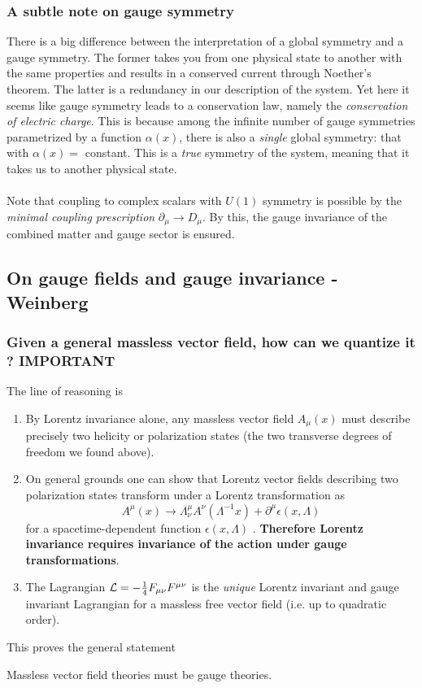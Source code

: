 \subsubsection{A subtle note on gauge symmetry}
There is a big difference between the interpretation of a global symmetry and a gauge symmetry. The former takes you from one physical state to another with the same properties and results in a conserved current through Noether's theorem. The latter is a redundancy in our description of the system. Yet here it seems like gauge symmetry leads to a conservation law, namely the \emph{conservation of electric charge}. This is because among the infinite number of gauge symmetries parametrized by a function $\alpha(x)$, there is also a \emph{single} global symmetry: that with $\alpha(x) =$ constant. This is a \emph{true} symmetry of the system, meaning that it takes us to another physical state.\\
\\
Note that coupling to complex scalars with $U(1)$ symmetry is possible by the \emph{minimal coupling prescription} $\partial_{\mu} \rightarrow D_{\mu}$. By this, the gauge invariance of the combined matter and gauge sector is ensured.

\subsection{On gauge fields and gauge invariance - Weinberg}

\subsubsection{Given a general massless vector field, how can we quantize it ? IMPORTANT}
The line of reasoning is
\begin{enumerate}
	\item By Lorentz invariance alone, any massless vector field $A_\mu ( x )$ must describe precisely two helicity or polarization states (the two transverse degrees of freedom we found above).
	\item On general grounds one can show that Lorentz vector fields describing two polarization states
	transform under a Lorentz transformation as
	\begin{equation}
		A^\mu ( x ) \rightarrow \Lambda^\mu_\nu A^\nu(\Lambda^{-1} x) + \partial^\mu \epsilon(x,\Lambda)
	\end{equation}
	for a spacetime-dependent function $\epsilon(x,\Lambda)$ . \textbf{Therefore Lorentz invariance requires invariance
	of the action under gauge transformations}.
\item The Lagrangian $\mathcal{L} = -\frac{1}{4} F_{\mu \nu} F^{\mu \nu}$ is the \emph{unique} Lorentz invariant and gauge invariant Lagrangian
for a massless free vector field (i.e. up to quadratic order).
\end{enumerate}
This proves the general statement
\begin{statements}
	Massless vector field theories must be gauge theories.
\end{statements}
